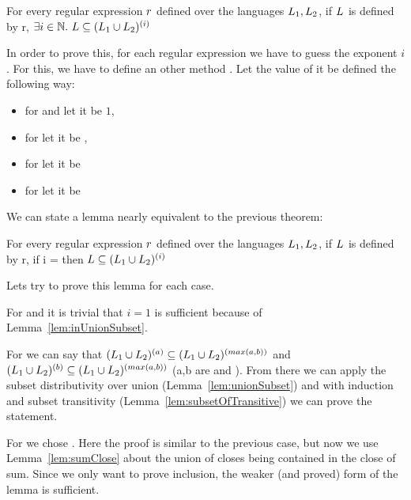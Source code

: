 \begin{theorem}
	For every regular expression $r$ defined over the languages $L_{1}, L_{2}$, if $L_{}$ is defined by r, $\exists i \in \mathbb{N}. ~ L \subseteq (L_{1} \cup L_{2})^{(i)}$
\end{theorem}

In order to prove this, for each regular expression we have to guess the exponent $i$. For this, we have to define an other method . Let the value of it be defined the following way:

\begin{itemize}
	\item for  and  let it be $1$,
	\item for  let it be ,
	\item for  let it be  
	\item for  let it be  
\end{itemize}

We can state a lemma nearly equivalent to the previous theorem:
\begin{lemma}
	\label{lem:regexSubsetStar}
	For every regular expression $r$ defined over the languages $L_{1}, L_{2}$, if $L_{}$ is defined by r, if i =  then $L \subseteq (L_{1} \cup L_{2})^{(i)}$
\end{lemma}

Lets try to prove this lemma for each case.

For  and  it is trivial that $i=1$ is sufficient because of Lemma~\ref{lem:inUnionSubset}.

For  we can say that $(L_{1} \cup L_{2})^{(a)} \subseteq (L_{1} \cup L_{2})^{(max(a,b))}$ and $(L_{1} \cup L_{2})^{(b)} \subseteq (L_{1} \cup L_{2})^{(max(a,b))}$ (a,b are  and ). From there we can apply the subset distributivity over union (Lemma~\ref{lem:unionSubset}) and with induction and subset transitivity (Lemma~\ref{lem:subsetOfTransitive}) we can prove the statement.

For  we chose . Here the proof is similar to the previous case, but now we use Lemma~\ref{lem:sumClose} about the union of closes being contained in the close of sum. Since we only want to prove inclusion, the weaker (and proved) form of the lemma is sufficient.

